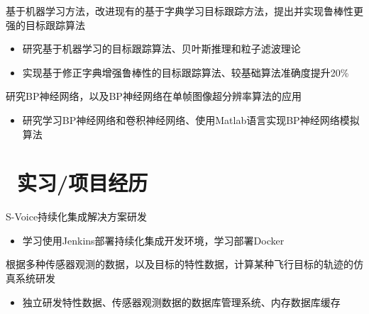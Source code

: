 \documentclass{resume}
\begin{document}
\begin{onehalfspacing}
基于机器学习方法，改进现有的基于字典学习目标跟踪方法，提出并实现鲁棒性更强的目标跟踪算法
\begin{itemize}
  \item 研究基于机器学习的目标跟踪算法、贝叶斯推理和粒子滤波理论
  \item 实现基于修正字典增强鲁棒性的目标跟踪算法、较基础算法准确度提升20\%
\end{itemize}
\end{onehalfspacing}

\begin{onehalfspacing}
研究BP神经网络，以及BP神经网络在单帧图像超分辨率算法的应用
\begin{itemize}
  \item 研究学习BP神经网络和卷积神经网络、使用Matlab语言实现BP神经网络模拟算法
\end{itemize}
\end{onehalfspacing}

\section{\faUsers\ 实习/项目经历}

S-Voice持续化集成解决方案研发
\begin{itemize}
  \item 学习使用Jenkins部署持续化集成开发环境，学习部署Docker
\end{itemize}

\begin{onehalfspacing}
根据多种传感器观测的数据，以及目标的特性数据，计算某种飞行目标的轨迹的仿真系统研发
\begin{itemize}
  \item 独立研发特性数据、传感器观测数据的数据库管理系统、内存数据库缓存
\end{itemize}
\end{onehalfspacing}
\end{document}
